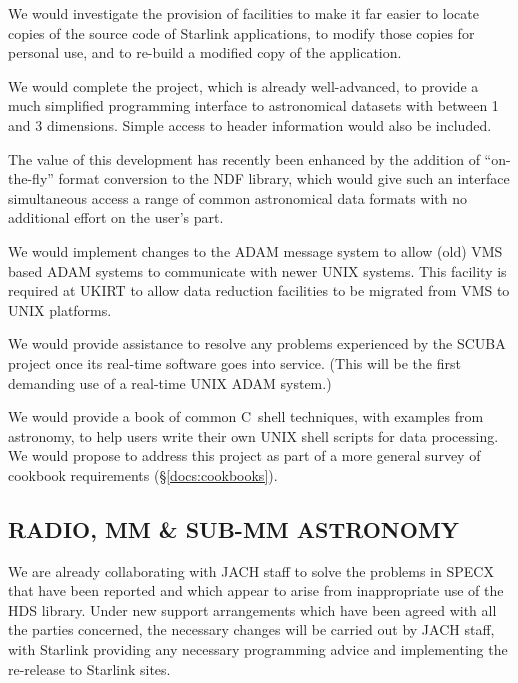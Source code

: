 {We would investigate the provision of facilities to make it far
easier to locate copies of the source code of Starlink applications,
to modify those copies for personal use, and to re-build a modified
copy of the application.}

{We would complete the project, which is already well-advanced, to
provide a much simplified programming interface to astronomical
datasets with between 1 and 3 dimensions. Simple access to header
information would also be included.

The value of this development has recently been enhanced by the
addition of ``on-the-fly'' format conversion to the NDF library, which
would give such an interface simultaneous access a range of common
astronomical data formats with no additional effort on the user's
part.}

{We would implement changes to the ADAM message system to allow (old)
VMS based ADAM systems to communicate with newer UNIX systems. This
facility is required at UKIRT to allow data reduction facilities to be
migrated from VMS to UNIX platforms.}

{We would provide assistance to resolve any problems experienced by
the SCUBA project once its real-time software goes into service. (This
will be the first demanding use of a real-time UNIX ADAM system.)}

{We would provide a book of common C~shell techniques, with examples
from astronomy, to help users write their own UNIX shell scripts for
data processing. We would propose to address this project as part of a
more general survey of cookbook requirements
(\S\ref{docs:cookbooks}).}

\subsection{RADIO, MM \& SUB-MM ASTRONOMY}

{We are already collaborating with JACH staff to solve the problems in
SPECX that have been reported and which appear to arise from
inappropriate use of the HDS library. Under new support arrangements
which have been agreed with all the parties concerned, the necessary
changes will be carried out by JACH staff, with Starlink providing any
necessary programming advice and implementing the re-release to
Starlink sites.}

